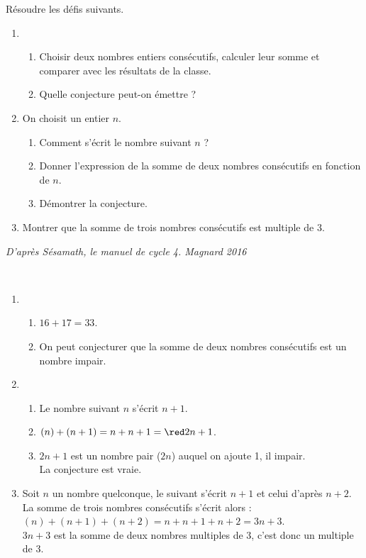 \begin{exercice*}
    Résoudre les défis suivants.
    \begin{enumerate}
       \item
          \begin{enumerate}
             \item Choisir deux nombres entiers consécutifs, calculer leur somme et comparer avec les résultats de la classe.
             \item Quelle conjecture peut-on émettre ?
          \end{enumerate}
       \item On choisit un entier $n$.
          \begin{enumerate}
             \item Comment s'écrit le nombre suivant $n$ ?
             \item Donner l'expression de la somme de deux nombres consécutifs en fonction de $n$.
             \item Démontrer la conjecture.
          \end{enumerate}
       \item Montrer que la somme de trois nombres consécutifs est multiple de 3.
    \end{enumerate}
    \phantom{rrr}\hfill\footnotesize\it D'après Sésamath, le manuel de cycle 4. Magnard 2016
 \end{exercice*}
 
 \begin{corrige}
 \ \\ [-5mm]
    \begin{enumerate}
       \item
          \begin{enumerate}
             \item {\red $16+17 =33$}.
             \item On peut conjecturer que  {\red la somme de deux nombres consécutifs est un nombre impair}.
          \end{enumerate}
       \setcounter{enumi}{1}
       \item
          \begin{enumerate}
             \item Le nombre suivant $n$ s'écrit {\red $n+1$}.
             \item $(n)+(n+1) =n+n+1 ={\red 2n+1}$.
             \item $2n+1$ est un nombre pair ($2n$) auquel on ajoute 1, il impair. \\
                {\red La conjecture est vraie}.
          \end{enumerate}
       \setcounter{enumi}{2}
       \item Soit $n$ un nombre quelconque, le suivant s'écrit $n+1$ et celui d'après $n+2$. \\
          La somme de trois nombres consécutifs s'écrit alors : \\
          $(n)+(n+1)+(n+2) =n+n+1+n+2 =3n+3$. \\
          $3n+3$ est la somme de deux nombres multiples de 3, {\red c'est donc un multiple de 3}.
    \end{enumerate}
 \end{corrige}   
 